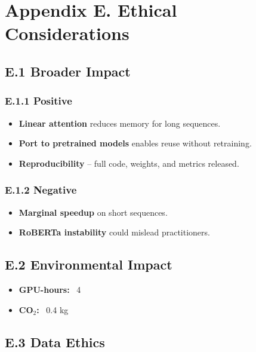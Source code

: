 
\section{Appendix E. Ethical Considerations}

\subsection{E.1 Broader Impact}

\subsubsection{E.1.1 Positive}

\begin{itemize}
\item \textbf{Linear attention} reduces memory for long sequences.
\item \textbf{Port to pretrained models} enables reuse without retraining.
\item \textbf{Reproducibility} -- full code, weights, and metrics released.

\end{itemize}
\subsubsection{E.1.2 Negative}

\begin{itemize}
\item \textbf{Marginal speedup} on short sequences.
\item \textbf{RoBERTa instability} could mislead practitioners.

\end{itemize}
\subsection{E.2 Environmental Impact}

\begin{itemize}
\item \textbf{GPU-hours:} ~4
\item \textbf{CO$_2$:} ~0.4 kg

\end{itemize}
\subsection{E.3 Data Ethics}

